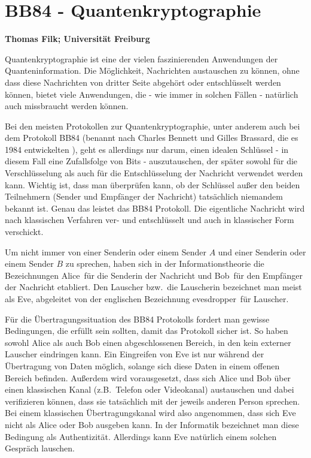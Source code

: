 
\setcounter{page}{1}
\setcounter{section}{0}
\setcounter{figure}{0}
\setcounter{equation}{0}
\setcounter{table}{0}
\setcounter{footnote}{0}

\section*{BB84 - Quantenkryptographie}
\noindent
{\bf Thomas Filk; Universit\"at Freiburg}
\vspace{1cm}
\label{chap_BB84}

\noindent
Quantenkryptographie ist eine der vielen faszinierenden Anwendungen der Quanteninformation.
Die M\"oglichkeit, Nachrichten austauschen zu k\"onnen, ohne dass diese Nachrichten
von dritter Seite abgeh\"ort oder entschl\"usselt werden k\"onnen, bietet viele Anwendungen,
die - wie immer in solchen F\"allen - nat\"urlich auch missbraucht werden k\"onnen. 

Bei den meisten Protokollen zur Quantenkryptographie, unter anderem auch bei dem
Protokoll BB84 (benannt nach Charles Bennett und Gilles Brassard, die es 1984 entwickelten \cite{Bennett}), 
geht es allerdings nur darum, einen idealen Schl\"ussel - in diesem Fall eine Zufallsfolge von 
Bits - aus\-zu\-tauschen, der sp\"ater sowohl f\"ur die Verschl\"usselung als auch f\"ur die
Entschl\"usselung der Nachricht verwendet werden kann. Wichtig ist, dass man \"uberpr\"ufen kann, 
ob der Schl\"ussel au\ss er den beiden Teilnehmern (Sender und Empf\"anger der Nachricht) tats\"achlich 
niemandem bekannt ist. Genau das leistet das BB84 Protokoll. Die eigentliche Nachricht wird nach
klassischen Verfahren ver- und entschl\"usselt und auch in klassischer Form verschickt.

Um nicht immer von einer Senderin oder einem Sender $A$ und einer Senderin oder
einem Sender $B$ zu sprechen, haben sich in der Informationstheorie die Bezeichnungen 
\glqq Alice\grqq\ f\"ur die Senderin der
Nachricht und \glqq Bob\grqq\ f\"ur den Empf\"anger der Nachricht etabliert. Den Lauscher bzw.\ die
Lauscherin bezeichnet man meist als \glqq Eve\grqq, abgeleitet von der englischen Bezeichnung
\glqq evesdropper\grqq\ f\"ur Lauscher. 

F\"ur die \"Ubertragungssituation des BB84 Protokolls fordert man gewisse Bedingungen, die erf\"ullt
sein sollten, damit das Protokoll sicher ist. So haben sowohl Alice als auch Bob einen abgeschlossenen Bereich,
in den kein externer Lauscher eindringen kann. Ein Eingreifen von Eve ist nur w\"ahrend der
\"Ubertragung von Daten m\"oglich, solange sich diese Daten in einem offenen Bereich befinden. 
Au\ss erdem wird vorausgesetzt, dass sich Alice und Bob \"uber einen klassischen Kanal (z.B.\ Telefon
oder Videokanal) austauschen und dabei verifizieren k\"onnen, dass sie tats\"achlich mit
der jeweils anderen Person sprechen. Bei einem klassischen \"Ubertragungskanal wird also
angenommen, dass sich Eve nicht als Alice oder Bob ausgeben kann. In der Informatik bezeichnet man
diese Bedingung als Authentizit\"at. Allerdings kann Eve nat\"urlich einem solchen Gespr\"ach lauschen.

